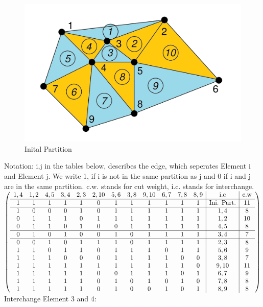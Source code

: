 \documentclass{article}
\begin{document}
\begin{enumerate}[label=(\alph*)]
    \begin{figure}[h]
    \centering
     \includegraphics[scale=0.3]{erste Zerlegung}
    \caption{Inital Partition}
    \label{fig:meine-grafik}
    \end{figure}
Notation: i,j in the tables below, describes the edge, which seperates Element i and Element j. We write 1, if i is not in the same partition as j and 0 if i and j are in the same partition. c.w. stands for cut weight,  i.c. stands for interchange.
\newline
$\left(
 \begin{array}{cccccccccccc|c | c}
            1, 4 & 1, 2 & 4,5 & 3, 4 & 2, 3 & 2, 10 & 5, 6 & 3, 8 & 9,10 & 6, 7 & 7, 8 & 8,9 & \text{i.c} & \text{c.w}\\
	\hline
            1 & 1 & 1 & 1 & 1 & 0 & 1 & 1 & 1 & 1 & 1 & 1 & \text{Ini. Part.} & 11\\
	\hline
            1 & 0 & 0 & 0 & 1 & 0 & 1 & 1 & 1 & 1 & 1 & 1 &  1,4  & 8\\
	 0 & 1 & 1 & 1 & 0 & 1 & 1 & 1 & 1 & 1 & 1 & 1 &  1,2 & 10\\
 	0 & 1 & 1 & 0 & 1 & 0 & 0 & 1 & 1 & 1 & 1 & 1 &  4, 5 & 8\\
	\hline
	 0 & 1 & 0 & 1 & 0 & 0 & 1 & 0 & 1 & 1 & 1 & 1 &  3, 4 & 7\\
	\hline
 	0 & 0 & 1 & 0 & 1 & 1 & 1 & 0 & 1 & 1 & 1 & 1 &  2, 3 & 8\\
	1 & 1 & 0 & 1 & 1 & 0 & 1 & 1 & 1 & 0 & 1 & 1 &  5, 6 & 9\\
	1 & 1 & 1 & 0 & 0 & 0 & 1 & 1 & 1 & 1 & 0 & 0 &  3, 8 & 7\\
	1 & 1 & 1 & 1 & 1 & 1 & 1 & 1 & 1 & 1 & 1 & 0 &  9, 10 & 11\\
	1 & 1 & 1 & 1 & 1 & 0 & 0 & 1 & 1 & 1 & 0 & 1 &  6, 7 & 9\\
	1 & 1 & 1 & 1 & 1 & 0 & 1 & 0 & 1 & 0 & 1 & 0 &  7,8 & 8\\
	1 & 1 & 1 & 1 & 1 & 0 & 1 & 0 & 0 & 1 & 0 & 1 & 8, 9 & 8\\
   \end{array}
\right)$
\newline
Interchange Element 3 and 4:


\end{enumerate}
\end{document}
